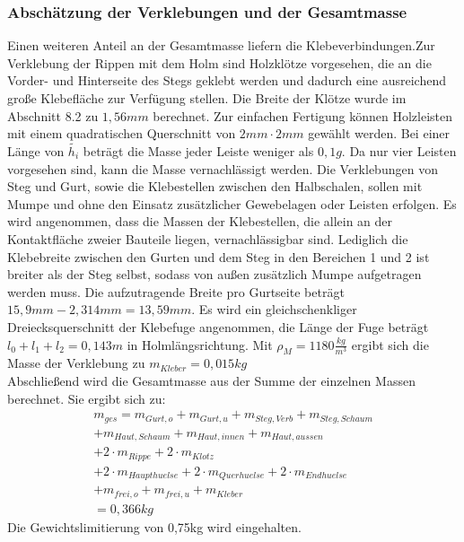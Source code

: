 \subsubsection{Abschätzung der Verklebungen und der Gesamtmasse}
Einen weiteren Anteil an der Gesamtmasse liefern die Klebeverbindungen.Zur Verklebung der Rippen mit dem Holm sind Holzklötze vorgesehen, die an die Vorder- und Hinterseite des Stegs geklebt werden und dadurch eine ausreichend große Klebefläche zur Verfügung stellen. Die Breite der Klötze wurde im Abschnitt 8.2 zu $ 1,56mm $ berechnet. Zur einfachen Fertigung können Holzleisten mit einem quadratischen Querschnitt von $ 2mm\cdot2mm $ gewählt werden. Bei einer Länge von $ \tilde{h_{i}} $ beträgt die Masse jeder Leiste weniger als $ 0,1g $. Da nur vier Leisten vorgesehen sind, kann die Masse vernachlässigt werden. Die Verklebungen von Steg und Gurt, sowie die Klebestellen zwischen den Halbschalen, sollen mit Mumpe und ohne den Einsatz zusätzlicher Gewebelagen oder Leisten erfolgen. Es wird angenommen, dass die Massen der Klebestellen, die allein an der Kontaktfläche zweier Bauteile liegen, vernachlässigbar sind. Lediglich die Klebebreite zwischen den Gurten und dem Steg in den Bereichen 1 und 2 ist breiter als der Steg selbst, sodass von außen zusätzlich Mumpe aufgetragen werden muss. Die aufzutragende Breite pro Gurtseite beträgt $ 15,9mm-2,314mm=13,59mm $. Es wird ein gleichschenkliger Dreiecksquerschnitt der Klebefuge angenommen, die Länge der Fuge beträgt $ l_{0}+l_{1}+l_{2}=0,143m $ in Holmlängsrichtung. Mit $ \rho_{M}=1180\frac{kg}{m^{3}} $ ergibt sich die Masse der Verklebung zu $ m_{Kleber}=0,015kg $       \\

\noindent Abschließend wird die Gesamtmasse aus der Summe der einzelnen Massen berechnet. Sie ergibt sich zu:
\begin{equation}
\begin{array}{l}
	m_{ges}= m_{Gurt,o}+m_{Gurt,u}+m_{Steg,Verb}+m_{Steg,Schaum} \\ +m_{Haut,Schaum}+m_{Haut,innen}+m_{Haut,aussen} \\ +2\cdot m_{Rippe}+2\cdot m_{Klotz} \\
	+2\cdot m_{Haupthuelse}+2\cdot m_{Querhuelse}+2\cdot m_{Endhuelse}\\
	+m_{frei,o}+m_{frei,u}+m_{Kleber}\\
	=0,366kg
\end{array}  
\end{equation}
Die Gewichtslimitierung von 0,75kg wird eingehalten.

